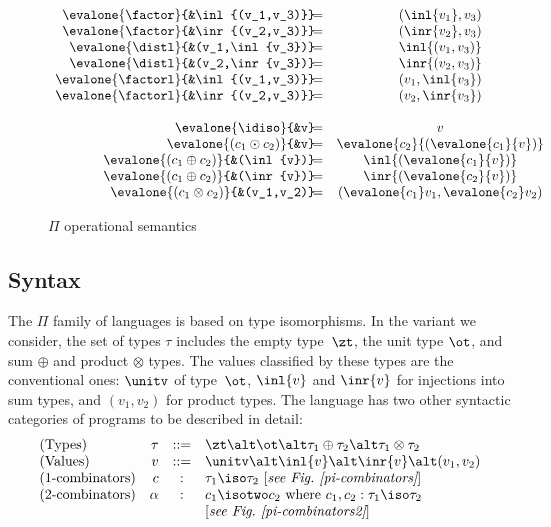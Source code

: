 \begin{figure*}[ht]
\begin{multicols}{2}
\[\begin{array}{r@{\!}lcl}
\evalone{\factor}{&\inl{(v_1,v_3)}} &=& (\inl{v_1},v_3) \\
\evalone{\factor}{&\inr{(v_2,v_3)}} &=& (\inr{v_2},v_3) \\
\evalone{\distl}{&(v_1,\inl{v_3})} &=& \inl{(v_1,v_3)} \\
\evalone{\distl}{&(v_2,\inr{v_3})} &=& \inr{(v_2,v_3)} \\
\evalone{\factorl}{&\inl{(v_1,v_3)}} &=& (v_1,\inl{v_3}) \\
\evalone{\factorl}{&\inr{(v_2,v_3)}} &=& (v_2,\inr{v_3}) \\
\\
\evalone{\idiso}{&v} &=& v \\
\evalone{(c_1 \odot c_2)}{&v} &=&
  \evalone{c_2}{(\evalone{c_1}{v})} \\
\evalone{(c_1 \oplus c_2)}{&(\inl{v})} &=&
  \inl{(\evalone{c_1}{v})} \\
\evalone{(c_1 \oplus c_2)}{&(\inr{v})} &=&
  \inr{(\evalone{c_2}{v})} \\
\evalone{(c_1 \otimes c_2)}{&(v_1,v_2)} &=&
  (\evalone{c_1}v_1, \evalone{c_2}v_2)
\end{array}\]
\end{multicols}
\caption{\label{opsem}$\Pi$ operational semantics}
\end{figure*}

\subsection{Syntax}
\label{opsempi}

The $\Pi$ family of languages is based on type isomorphisms. In the
variant we consider, the set of types $\tau$ includes the empty
type~$\zt$, the unit type $\ot$, and sum $\oplus$ and product
$\otimes$ types. The values classified by these types are the
conventional ones: $\unitv$ of type~$\ot$, $\inl{v}$ and $\inr{v}$ for
injections into sum types, and $(v_1,v_2)$ for product types. The
language has two other syntactic categories of programs to be
described in detail:
\[\begin{array}{lrcl}
(\textrm{Types}) &
  \tau &::=& \zt \alt \ot \alt \tau_1 \oplus \tau_2 \alt \tau_1 \otimes \tau_2 \\
(\textrm{Values}) &
  v &::=& \unitv \alt \inl{v} \alt \inr{v} \alt (v_1,v_2) \\
(\textrm{1-combinators}) &
  c &:& \tau_1 \iso \tau_2 ~ [\textit{see Fig.~\ref{pi-combinators}}] \\
(\textrm{2-combinators}) &
  \alpha &:& c_1 \isotwo c_2 \mbox{~where~} c_1, c_2 : \tau_1 \iso \tau_2 \\
  & && [\textit{see Fig.~\ref{pi-combinators2}}]
\end{array}\]

